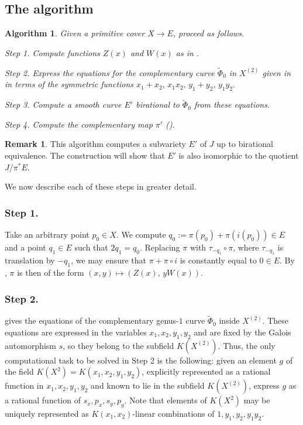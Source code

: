 \documentclass[a4paper,twoside,english]{amsart}
\theoremstyle{plain}
\newtheorem{algorithm}[theorem]{Algorithm}
\theoremstyle{definition}
\newtheorem{remark}[theorem]{Remark}
\begin{document}
\subsection{The algorithm}\label{subsec: algorithm}

\begin{algorithm} 
\label{algorithm} Given a primitive cover $X \to E$, proceed as follows.

Step 1. Compute functions $Z(x)$ and $W(x)$ as in . %

Step 2. Express the equations for the complementary curve $\tilde{\Phi}_0$ in $X^{(2)}$ given in  in terms of the symmetric functions $x_1 + x_2, \, x_1 x_2, \, y_1 + y_2, \, y_1 y_2.$

Step 3. Compute a smooth curve $E'$ birational to $\tilde{\Phi}_0$ from these equations. %

Step 4. Compute the complementary map $\pi'$ ().
\end{algorithm}

\begin{remark}
    This algorithm computes a subvariety $E'$ of $J$ up to birational equivalence. The construction will show that $E'$ is also isomorphic to the quotient $J/\pi^* E$. 
\end{remark}


We now describe each of these steps in greater detail.

\subsubsection{Step 1.}
Take an arbitrary point $p_0 \in X$. We compute $q_0 := \pi(p_0) + \pi(i(p_0)) \in E$ and a point $q_1 \in E$ such that $2q_1 = q_0$. Replacing $\pi$ with $\tau_{-q_1} \circ \pi$, where $\tau_{-q_1}$ is translation by $-q_1$, we may ensure that $\pi + \pi \circ i$ is constantly equal to $0 \in E$. By , $\pi$ is then of the form $(x,y) \mapsto (Z(x), \, yW(x))$.

\subsubsection{Step 2.}
 gives the equations of the complementary genus-$1$ curve $\tilde{\Phi}_0$ inside $X^{(2)}$. These equations are expressed in the variables $x_1, x_2, y_1, y_2$ and are fixed by the Galois automorphism $s$, so they belong to the subfield $K(X^{(2)})$.
Thus, the only computational task to be solved in Step 2 is the following: given an element $g$ of the field $K(X^2)=K(x_1, x_2, y_1, y_2)$, explicitly represented as a rational function in $x_1, x_2, y_1, y_2$ and known to lie in the subfield $K(X^{(2)})$, express $g$ as a rational function of $s_x, p_x, s_y, p_y$. Note that elements of $K(X^2)$ may be uniquely represented as $K(x_1,x_2)$-linear combinations of $1, y_1, y_2, y_1y_2$.
\end{document}
